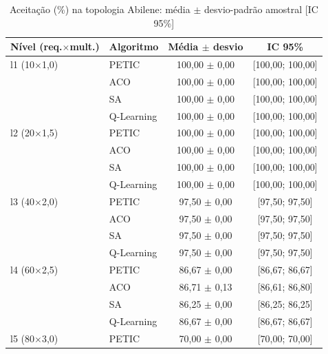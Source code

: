 \begin{table}[htb]
    \centering
    \small
    \caption{Aceitação (\%) na topologia Abilene: média $\pm$ desvio-padrão amostral [IC 95\%]}
    \label{tab:aceitacao-abilene}
    \begin{tabular}{llcc}
        \hline
        Nível (req.$\times$mult.) & Algoritmo & Média $\pm$ desvio & IC 95\% \\
        \hline
        l1 (10$\times$1,0) & PETIC & 100,00 $\pm$ 0,00 & [100,00; 100,00] \\
         & ACO & 100,00 $\pm$ 0,00 & [100,00; 100,00] \\
         & SA & 100,00 $\pm$ 0,00 & [100,00; 100,00] \\
         & Q-Learning & 100,00 $\pm$ 0,00 & [100,00; 100,00] \\
        \hline
        l2 (20$\times$1,5) & PETIC & 100,00 $\pm$ 0,00 & [100,00; 100,00] \\
         & ACO & 100,00 $\pm$ 0,00 & [100,00; 100,00] \\
         & SA & 100,00 $\pm$ 0,00 & [100,00; 100,00] \\
         & Q-Learning & 100,00 $\pm$ 0,00 & [100,00; 100,00] \\
        \hline
        l3 (40$\times$2,0) & PETIC & 97,50 $\pm$ 0,00 & [97,50; 97,50] \\
         & ACO & 97,50 $\pm$ 0,00 & [97,50; 97,50] \\
         & SA & 97,50 $\pm$ 0,00 & [97,50; 97,50] \\
         & Q-Learning & 97,50 $\pm$ 0,00 & [97,50; 97,50] \\
        \hline
        l4 (60$\times$2,5) & PETIC & 86,67 $\pm$ 0,00 & [86,67; 86,67] \\
         & ACO & 86,71 $\pm$ 0,13 & [86,61; 86,80] \\
         & SA & 86,25 $\pm$ 0,00 & [86,25; 86,25] \\
         & Q-Learning & 86,67 $\pm$ 0,00 & [86,67; 86,67] \\
        \hline
        l5 (80$\times$3,0) & PETIC & 70,00 $\pm$ 0,00 & [70,00; 70,00] \\

\end{tabular}
\end{table}
